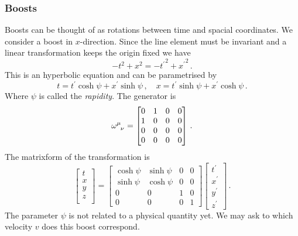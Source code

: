 \subsubsection*{Boosts}
Boosts can be thought of as rotations between time and spacial coordinates. We
consider a boost in $x$-direction. Since the line element must be invariant and
a linear transformation keeps the origin fixed we have
\begin{equation}
    -t^2+x^2=-{t^\prime}^2+{x^\prime}^2\, .
\end{equation}
This is an hyperbolic equation and can be parametrised by
\begin{equation}
    t = t^\prime\cosh\psi+x^\prime\sinh\psi\,, \quad x =
    t^\prime\sinh\psi+x^\prime\cosh\psi\, .
\end{equation}
Where $\psi$ is called the \emph{rapidity}.
The generator is
\begin{equation}
    \tensor{\omega}{^\mu_\nu}
    =
    \begin{bmatrix}
        0&1 & 0&0\\
        1&0 &0&0\\
        0&0&0 &0\\
        0&0 &0 &0
    \end{bmatrix}\,.
\end{equation}
The matrixform of the transformation is
\begin{equation}
    \begin{bmatrix}
        t\\
        x\\
        y\\
        z\\
    \end{bmatrix}=
    \begin{bmatrix}
        \cosh\psi&\sinh\psi & 0&0\\
        \sinh\psi&\cosh\psi &0&0\\
        0&0&1 &0\\
        0&0 &0 &1
    \end{bmatrix}
    \begin{bmatrix}
        t^\prime\\
        x^\prime\\
        y^\prime\\
        z^\prime
    \end{bmatrix}\, .
\end{equation}
The parameter $\psi$ is not related to a physical quantity yet. We may ask to which
velocity $v$ does this boost correspond.

